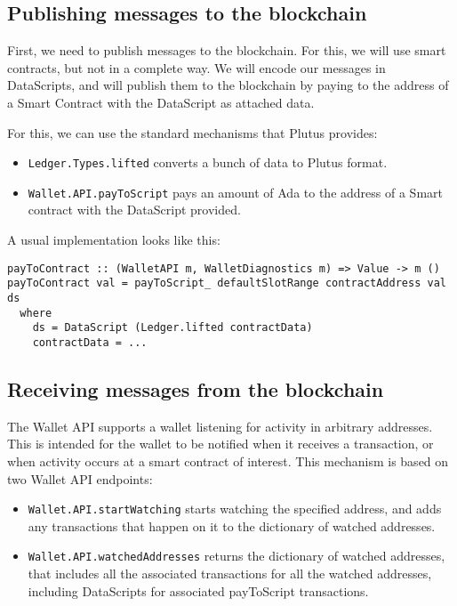 \documentclass{article}
\begin{document}
\subsection{Publishing messages to the blockchain}
First, we need to publish messages to the blockchain. For this, we will use smart contracts, but not in a complete way. We will encode our messages in DataScripts, and will publish them to the blockchain by paying to the address of a Smart Contract with the DataScript as attached data.

For this, we can use the standard mechanisms that Plutus provides:

\begin{itemize}
\item \verb|Ledger.Types.lifted| converts a bunch of data to Plutus format.
\item \verb|Wallet.API.payToScript| pays an amount of Ada to the address of a Smart contract with the DataScript provided.
\end{itemize}

A usual implementation looks like this:
\nopagebreak
\begin{verbatim}
payToContract :: (WalletAPI m, WalletDiagnostics m) => Value -> m ()
payToContract val = payToScript_ defaultSlotRange contractAddress val ds
  where
    ds = DataScript (Ledger.lifted contractData)
    contractData = ...
\end{verbatim}

\subsection{Receiving messages from the blockchain}
The Wallet API supports a wallet listening for activity in arbitrary addresses. This is intended for the wallet to be notified when it receives a transaction, or when activity occurs at a smart contract of interest. This mechanism is based on two Wallet API endpoints:
\nopagebreak
\begin{itemize}
\item \verb|Wallet.API.startWatching| starts watching the specified address, and adds any transactions that happen on it to the dictionary of watched addresses.
\item \verb|Wallet.API.watchedAddresses| returns the dictionary of watched addresses, that includes all the associated transactions for all the watched addresses, including DataScripts for associated payToScript transactions.
\end{itemize}
\end{document}
